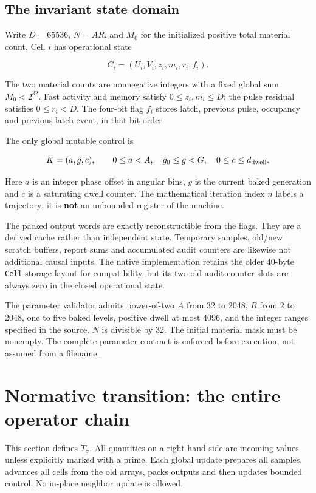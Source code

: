 \documentclass[11pt,a4paper]{article}
\begin{document}
\subsection{The invariant state
domain}\label{the-invariant-state-domain}

Write \(D=65536\), \(N=AR\), and \(M_0\) for the initialized positive
total material count. Cell \(i\) has operational state

\[
C_i=(U_i,V_i,z_i,m_i,r_i,f_i).
\]

The two material counts are nonnegative integers with a fixed global sum
\(M_0<2^{32}\). Fast activity and memory satisfy \(0\le z_i,m_i\le D\);
the pulse residual satisfies \(0\le r_i<D\). The four-bit flag \(f_i\)
stores latch, previous pulse, occupancy and previous latch event, in
that bit order.

The only global mutable control is

\[
K=(a,g,c),\qquad
0\le a<A,\quad g_0\le g<G,\quad 0\le c\le d_{\rm dwell}.
\]

Here \(a\) is an integer phase offset in angular bins, \(g\) is the
current baked generation and \(c\) is a saturating dwell counter. The
mathematical iteration index \(n\) labels a trajectory; it is
\textbf{not} an unbounded register of the machine.

The packed output words are exactly reconstructible from the flags. They
are a derived cache rather than independent state. Temporary samples,
old/new scratch buffers, report sums and accumulated audit counters are
likewise not additional causal inputs. The native implementation retains
the older 40-byte \texttt{Cell} storage layout for compatibility, but
its two old audit-counter slots are always zero in the closed
operational state.

The parameter validator admits power-of-two \(A\) from 32 to 2048, \(R\)
from 2 to 2048, one to five baked levels, positive dwell at most 4096,
and the integer ranges specified in the source. \(N\) is divisible by
32. The initial material mask must be nonempty. The complete parameter
contract is enforced before execution, not assumed from a filename.

\section{Normative transition: the entire operator
chain}\label{normative-transition-the-entire-operator-chain}

This section defines \(T_\sigma\). All quantities on a right-hand side
are incoming values unless explicitly marked with a prime. Each global
update prepares all samples, advances all cells from the old arrays,
packs outputs and then updates bounded control. No in-place neighbor
update is allowed.
\end{document}
